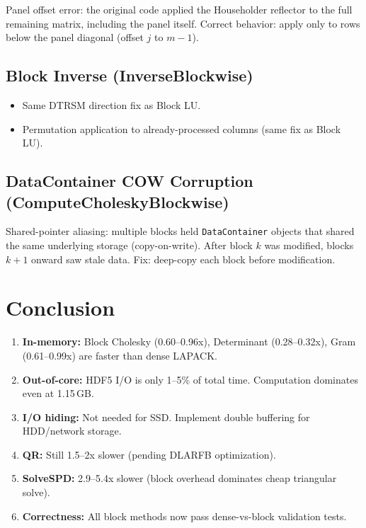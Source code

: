 \documentclass[11pt,a4paper]{article}
\begin{document}
Panel offset error: the original code applied the Householder reflector to the
full remaining matrix, including the panel itself. Correct behavior: apply only
to rows below the panel diagonal (offset $j$ to $m{-}1$).

\subsection{Block Inverse (InverseBlockwise)}

\begin{itemize}
\item Same DTRSM direction fix as Block LU.
\item Permutation application to already-processed columns (same fix as Block LU).
\end{itemize}

\subsection{DataContainer COW Corruption (ComputeCholeskyBlockwise)}

Shared-pointer aliasing: multiple blocks held \texttt{DataContainer} objects that
shared the same underlying storage (copy-on-write). After block $k$ was
modified, blocks $k{+}1$ onward saw stale data. Fix: deep-copy each block
before modification.

\section{Conclusion}

\begin{enumerate}
\item \textbf{In-memory:} Block Cholesky (0.60--0.96x), Determinant (0.28--0.32x), Gram (0.61--0.99x) are faster than dense LAPACK.
\item \textbf{Out-of-core:} HDF5 I/O is only 1--5\% of total time. Computation dominates even at 1.15\,GB.
\item \textbf{I/O hiding:} Not needed for SSD. Implement double buffering for HDD/network storage.
\item \textbf{QR:} Still 1.5--2x slower (pending DLARFB optimization).
\item \textbf{SolveSPD:} 2.9--5.4x slower (block overhead dominates cheap triangular solve).
\item \textbf{Correctness:} All block methods now pass dense-vs-block validation tests.
\end{enumerate}
\end{document}
